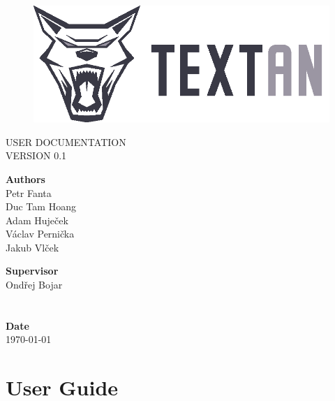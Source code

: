 \documentclass[12pt,a4paper]{report}
\begin{document}
\begin{titlepage}
\BgThispage
{}

\begin{figure}
 \includegraphics{../Logos/TEXTAN_logo_grey_B}
\end{figure}
\noindent
\textcolor{TextanRed}{\chapterfont\fontsize{48pt}{1pt}\selectfont\MakeUppercase{User documentation}}\\[15pt]
\textcolor{TextanDarkRed}{\sectionfont\LARGE\MakeUppercase{Version 0.1}}

\vfill
\noindent
\begin{minipage}[b]{.75\textwidth}
\textbf{Authors}\\
Petr Fanta\\
Duc Tam Hoang\\
Adam Huječek\\
Václav Pernička\\
Jakub Vlček
\end{minipage}%
\begin{minipage}[b]{.25\textwidth}
\textbf{Supervisor} \\
Ondřej Bojar\\
\\
\\
\textbf{Date}\\
\today
\end{minipage}

\end{titlepage}
\restoregeometry

\tableofcontents



\chapter{User Guide}
\end{document}
